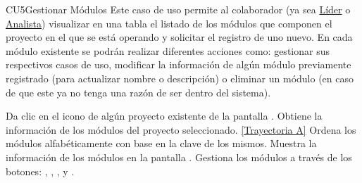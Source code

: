 	\begin{UseCase}{CU5}{Gestionar Módulos}{
	Este caso de uso permite al colaborador (ya sea \hyperlink{jefe}{Líder} o \hyperlink{analista}{Analista}) visualizar en una tabla el listado de los módulos que componen el proyecto en el que se está operando y solicitar el registro de uno nuevo. En cada módulo existente se podrán realizar diferentes acciones como: gestionar sus respectivos casos de uso, modificar la información de algún módulo previamente registrado (para actualizar nombre o descripción) o eliminar un módulo (en caso de que este ya no tenga una razón de ser dentro del sistema).\\
	}
\end{UseCase}
\begin{UCtrayectoria}
	\UCpaso[\UCactor] Da clic en el icono  de algún proyecto existente de la pantalla .
	\UCpaso[\UCsist] Obtiene la información de los módulos del proyecto seleccionado. \hyperlink{CU5:TAA}{[Trayectoria A]}
	\UCpaso[\UCsist] Ordena los módulos alfabéticamente con base en la clave de los mismos.
	\UCpaso[\UCsist] Muestra la información de los módulos en la pantalla .\label{CU5-P3}
	\UCpaso[\UCactor] Gestiona los módulos a través de los botones: , \editar, \eliminar, \UCsist  y .
\end{UCtrayectoria}		

